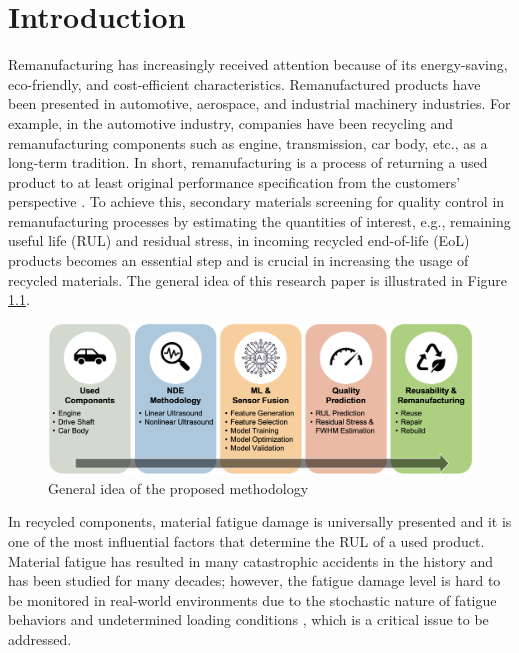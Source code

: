 \chapter{Introduction}
\label{chap: intro}
Remanufacturing has increasingly received attention because of its energy-saving, eco-friendly, and cost-efficient characteristics. Remanufactured products have been presented in automotive, aerospace, and industrial machinery industries. For example, in the automotive industry, companies have been recycling and remanufacturing components such as engine, transmission, car body, etc., as a long-term tradition. In short, remanufacturing is a process of returning a used product to at least original performance specification from the customers’ perspective \cite{remanufacturing-IJOMAH2004}. To achieve this, secondary materials screening for quality control in remanufacturing processes by estimating the quantities of interest, e.g., remaining useful life (RUL) and residual stress, in incoming recycled end-of-life (EoL) products becomes an essential step and is crucial in increasing the usage of recycled materials. The general idea of this research paper is illustrated in Figure \ref{fig: general idea}.

\begin{figure}[tb]
    \centering
    \includegraphics[width=\linewidth]{fig/general_idea.png}
    \caption{General idea of the proposed methodology}
    \label{fig: general idea}
\end{figure}

In recycled components, material fatigue damage is universally presented and it is one of the most influential factors that determine the RUL of a used product. Material fatigue has resulted in many catastrophic accidents in the history and has been studied for many decades; however, the fatigue damage level is hard to be monitored in real-world environments due to the stochastic nature of fatigue behaviors and undetermined loading conditions \cite{fatigue-review-Santecchia2016}, which is a critical issue to be addressed.


